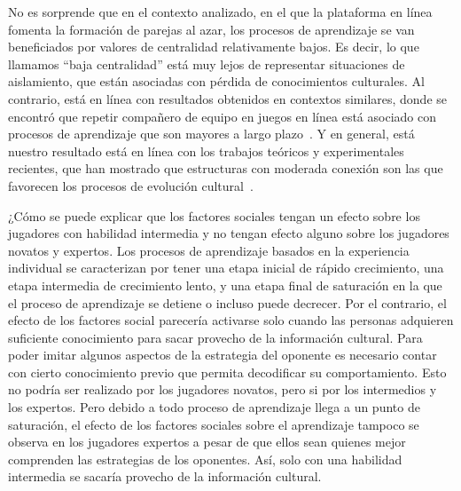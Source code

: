 \documentclass[a4paper,11pt]{book}
\theoremstyle{definition}
\begin{document}
No es sorprende que en el contexto analizado, en el que la plataforma en línea fomenta la formación de parejas al azar, los procesos de aprendizaje se van beneficiados por valores de centralidad relativamente bajos.
%
Es decir, lo que llamamos ``baja centralidad'' está muy lejos de representar situaciones de aislamiento, que están asociadas con pérdida de conocimientos culturales.
%
Al contrario, está en línea con resultados obtenidos en contextos similares, donde se encontró que repetir compañero de equipo en juegos en línea está asociado con procesos de aprendizaje que son mayores a largo plazo~\cite{Landfried2019}.
%
Y en general, está nuestro resultado está en línea con los trabajos teóricos y experimentales recientes, que han mostrado que estructuras con moderada conexión son las que favorecen los procesos de evolución cultural~\cite{Derex2020}.

¿Cómo se puede explicar que los factores sociales tengan un efecto sobre los jugadores con habilidad intermedia y no tengan efecto alguno sobre los jugadores novatos y expertos.
%
Los procesos de aprendizaje basados en la experiencia individual se caracterizan por tener una etapa inicial de rápido crecimiento, una etapa intermedia de crecimiento lento, y una etapa final de saturación en la que el proceso de aprendizaje se detiene o incluso puede decrecer.
%
Por el contrario, el efecto de los factores social parecería activarse solo cuando las personas adquieren suficiente conocimiento para sacar provecho de la información cultural.
%
Para poder imitar algunos aspectos de la estrategia del oponente es necesario contar con cierto conocimiento previo que permita decodificar su comportamiento.
%
Esto no podría ser realizado por los jugadores novatos, pero si por los intermedios y los expertos.
%
Pero debido a todo proceso de aprendizaje llega a un punto de saturación, el efecto de los factores sociales sobre el aprendizaje tampoco se observa en los jugadores expertos a pesar de que ellos sean quienes mejor comprenden las estrategias de los oponentes.
%
Así, solo con una habilidad intermedia se sacaría provecho de la información cultural.%
\end{document}
